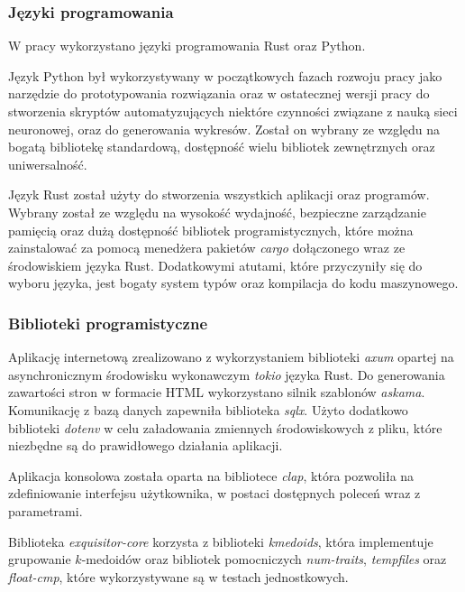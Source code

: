 \documentclass{article}
\newcommand{\temporary}[1]{
    \begin{tcolorbox}[colframe=red, colback=white, title={\textbf{WERSJA PO POLSKU}}, sharp corners=south]
        #1
    \end{tcolorbox}
}
\begin{document}
            \temporary{
                \subsubsection{Języki programowania}

            W pracy wykorzystano języki programowania Rust\cite{Rust} oraz Python\cite{Python}.

            Język Python był wykorzystywany w początkowych fazach rozwoju pracy jako narzędzie do prototypowania rozwiązania oraz w ostatecznej wersji pracy do stworzenia skryptów automatyzujących niektóre czynności związane z nauką sieci neuronowej, oraz do generowania wykresów. Został on wybrany ze względu na bogatą bibliotekę standardową, dostępność wielu bibliotek zewnętrznych oraz uniwersalność.

            Język Rust został użyty do stworzenia wszystkich aplikacji oraz programów. Wybrany został ze względu na wysokość wydajność, bezpieczne zarządzanie pamięcią oraz dużą dostępność bibliotek programistycznych, które można zainstalować za pomocą menedżera pakietów \textit{cargo}\cite{Rust:cargo} dołączonego wraz ze środowiskiem języka Rust. Dodatkowymi atutami, które przyczyniły się do wyboru języka, jest bogaty system typów oraz kompilacja do kodu maszynowego.

        \subsubsection{Biblioteki programistyczne}

            Aplikację internetową zrealizowano z wykorzystaniem biblioteki \textit{axum}\cite{Rust:axum} opartej na asynchronicznym środowisku wykonawczym \textit{tokio}\cite{Rust:tokio} języka Rust.
            Do generowania zawartości stron w formacie HTML wykorzystano silnik szablonów \textit{askama}\cite{Rust:askama}. Komunikację z bazą danych zapewniła biblioteka \textit{sqlx}\cite{Rust:sqlx}. Użyto dodatkowo biblioteki \textit{dotenv}\cite{Rust:dotenv} w celu załadowania zmiennych środowiskowych z pliku, które niezbędne są do prawidłowego działania aplikacji.

            Aplikacja konsolowa została oparta na bibliotece \textit{clap}\cite{Rust:clap}, która pozwoliła na zdefiniowanie interfejsu użytkownika, w postaci dostępnych poleceń wraz z parametrami.

            Biblioteka \textit{exquisitor-core} korzysta z biblioteki \textit{kmedoids}\cite{Schubert:2022}, która implementuje grupowanie $k$-medoidów oraz bibliotek pomocniczych \textit{num-traits}, \textit{tempfiles} oraz \textit{float-cmp}, które wykorzystywane są w testach jednostkowych.

}
\end{document}
